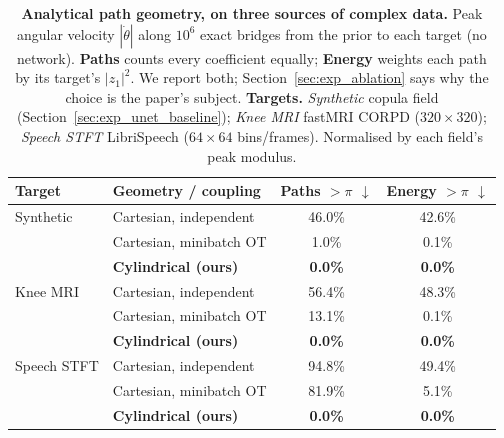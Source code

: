 \begin{table}[t]
    \centering
    \caption{\textbf{Analytical path geometry, on three sources of complex data.} Peak angular velocity $|\dot{\theta}|$ along $10^6$ exact bridges from the prior to each target (no network). \textbf{Paths} counts every coefficient equally; \textbf{Energy} weights each path by its target's $|z_1|^2$. We report both; Section~\ref{sec:exp_ablation} says why the choice is the paper's subject. \textbf{Targets.} \emph{Synthetic} copula field (Section~\ref{sec:exp_unet_baseline}); \emph{Knee MRI} fastMRI CORPD ($320\times320$); \emph{Speech STFT} LibriSpeech ($64\times64$ bins/frames). Normalised by each field's peak modulus.}
    \label{tab:bridge_ablation}
    \vspace{1mm}
    \begin{tabular}{llcc}
        \toprule
        \textbf{Target} & \textbf{Geometry / coupling} & \textbf{Paths $> \pi$ $\downarrow$} & \textbf{Energy $> \pi$ $\downarrow$} \\
        \midrule
        Synthetic
          & Cartesian, independent  & 46.0\% & 42.6\% \\
          & Cartesian, minibatch OT & 1.0\%  & 0.1\%  \\
          & \textbf{Cylindrical (ours)} & \textbf{0.0\%} & \textbf{0.0\%} \\
        \midrule
        Knee MRI
          & Cartesian, independent  & 56.4\% & 48.3\% \\
          & Cartesian, minibatch OT & 13.1\% & 0.1\%  \\
          & \textbf{Cylindrical (ours)} & \textbf{0.0\%} & \textbf{0.0\%} \\
        \midrule
        Speech STFT
          & Cartesian, independent  & 94.8\% & 49.4\% \\
          & Cartesian, minibatch OT & 81.9\% & 5.1\%  \\
          & \textbf{Cylindrical (ours)} & \textbf{0.0\%} & \textbf{0.0\%} \\
        \bottomrule
    \end{tabular}
    \vspace{1mm}
\end{table}
